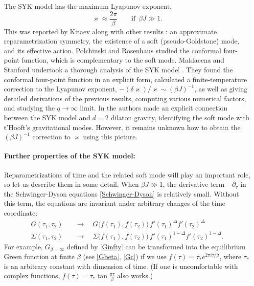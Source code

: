 \documentclass[12pt]{article}
\newcommand{\kap}{\varkappa}
\begin{document}
The SYK model has the maximum Lyapunov exponent,
\begin{equation}
\kap\approx \frac{2\pi}{\beta}\qquad
\text{if }\, \beta J\gg 1.
\end{equation}
This was reported by Kitaev \cite{Kit.KITP.1} along with other results \cite{Kit.KITP}: an approximate reparametrization symmetry, the existence of a soft (pseudo-Goldstone) mode, and its effective action. Polchinski and Rosenhaus \cite{PoRo16} studied the conformal four-point function, which is complementary to the soft mode. Maldacena and Stanford undertook a thorough analysis of the SYK model \cite{MS16}. They found the conformal four-point function in an explicit form, calculated a finite-temperature correction to the Lyapunov exponent, $-(\delta\kap)/\kap \sim(\beta J)^{-1}$, as well as giving detailed derivations of the previous results, computing various numerical factors, and studying the $q\to\infty$ limit. In \cite{Jen16, MSY16, EMV16} the authors made an explicit connection between the SYK model and $d=2$ dilaton gravity, identifying the soft mode with t'Hooft's gravitational modes. However, it remains unknown how to obtain the $(\beta J)^{-1}$ correction to $\kap$ using this picture.

\paragraph{Further properties of the SYK model:}
Reparametrizations of time and the related soft mode will play an important role, so let us describe them in some detail. When $\beta J\gg 1$, the derivative term $-\partial_\tau$ in the Schwinger-Dyson equations \eqref{Schwinger-Dyson} is relatively small. Without this term, the equations are invariant under arbitrary changes of the time coordinate:
\begin{equation}
\begin{aligned}
G(\tau_1,\tau_2) \quad &\longrightarrow\quad
G\bigl(f(\tau_1),f(\tau_2)\bigr)\,
f'(\tau_1)^{\Delta}f'(\tau_2)^{\Delta}
\\[3pt]
\Sigma(\tau_1,\tau_2) \quad &\longrightarrow\quad
\Sigma\bigl(f(\tau_1),f(\tau_2)\bigr)\,
f'(\tau_1)^{1-\Delta}f'(\tau_2)^{1-\Delta}.
\end{aligned}
\end{equation}
For example, $G_{\beta=\infty}$ defined by \eqref{Ginfty} can be transformed into the equilibrium Green function at finite $\beta$ (see \eqref{Gbeta}, \eqref{Gc}) if we use $f(\tau)=\tau_{*}e^{2\pi i\tau/\beta}$, where $\tau_*$ is an arbitrary constant with dimension of time. (If one is uncomfortable with complex functions, $f(\tau)=\tau_{*}\tan\frac{\pi\tau}{\beta}$ also works.)
\end{document}
